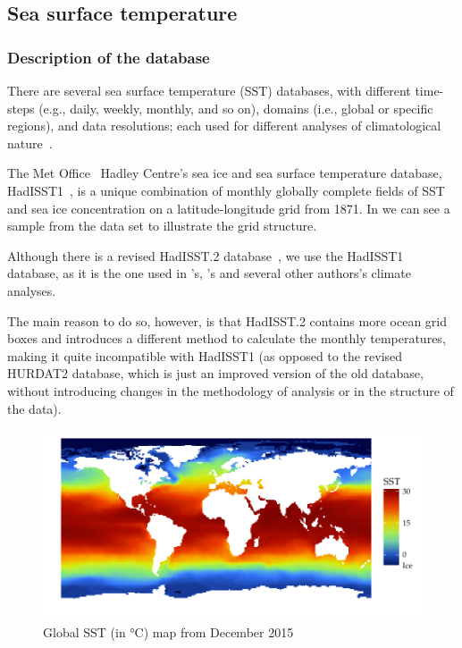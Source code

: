 \subsection{Sea surface temperature}\label{ssec:sst}

\subsubsection{Description of the database}\label{ssec:hadisst-intro}
There are several sea surface temperature (SST) databases, with different time-steps (e.g., daily, weekly, monthly, and so on), domains (i.e., global or specific regions), and data resolutions; each used for different analyses of climatological nature~\cite{o:sst-comparison, Rayner2003}.

The Met Office~\cite{o:met-office} Hadley Centre's sea ice and sea surface temperature database, HadISST1~\cite{o:hadisst1}, is a unique combination of monthly globally complete fields of SST and sea ice concentration on a latitude-longitude grid from 1871. In  we can see a sample from the data set to illustrate the grid structure.

Although there is a revised HadISST.2 database~\cite{o:hadisst2}, we use the HadISST1 database, as it is the one used in \citeauthor{Corral2010}'s, \citeauthor{Webster2005}'s and several other authors's climate analyses.

The main reason to do so, however, is that HadISST.2 contains more ocean grid boxes and introduces a different method to calculate the monthly temperatures, making it quite incompatible with HadISST1 (as opposed to the revised HURDAT2 database, which is just an improved version of the old database, without introducing changes in the methodology of analysis or in the structure of the data).

\begin{figure}[H]
	\centering
	\includegraphics[width=\textwidth]{images/sst-raster-map}
	\caption{Global SST (in \si{\celsius}) map from December 2015}
	\label{fig:sst-raster-map}
\end{figure}

